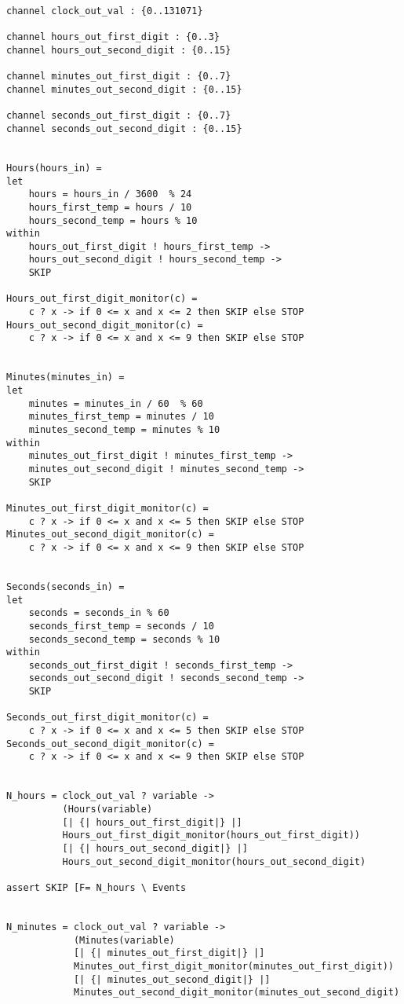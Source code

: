 \begin{verbatim}
channel clock_out_val : {0..131071}

channel hours_out_first_digit : {0..3}
channel hours_out_second_digit : {0..15}

channel minutes_out_first_digit : {0..7}
channel minutes_out_second_digit : {0..15}

channel seconds_out_first_digit : {0..7}
channel seconds_out_second_digit : {0..15}


Hours(hours_in) =
let
    hours = hours_in / 3600  % 24
    hours_first_temp = hours / 10
    hours_second_temp = hours % 10
within
    hours_out_first_digit ! hours_first_temp ->
    hours_out_second_digit ! hours_second_temp ->
    SKIP

Hours_out_first_digit_monitor(c) =
    c ? x -> if 0 <= x and x <= 2 then SKIP else STOP
Hours_out_second_digit_monitor(c) =
    c ? x -> if 0 <= x and x <= 9 then SKIP else STOP


Minutes(minutes_in) =
let
    minutes = minutes_in / 60  % 60
    minutes_first_temp = minutes / 10
    minutes_second_temp = minutes % 10
within
    minutes_out_first_digit ! minutes_first_temp ->
    minutes_out_second_digit ! minutes_second_temp ->
    SKIP

Minutes_out_first_digit_monitor(c) =
    c ? x -> if 0 <= x and x <= 5 then SKIP else STOP
Minutes_out_second_digit_monitor(c) =
    c ? x -> if 0 <= x and x <= 9 then SKIP else STOP


Seconds(seconds_in) =
let
    seconds = seconds_in % 60
    seconds_first_temp = seconds / 10
    seconds_second_temp = seconds % 10
within
    seconds_out_first_digit ! seconds_first_temp ->
    seconds_out_second_digit ! seconds_second_temp ->
    SKIP

Seconds_out_first_digit_monitor(c) =
    c ? x -> if 0 <= x and x <= 5 then SKIP else STOP
Seconds_out_second_digit_monitor(c) =
    c ? x -> if 0 <= x and x <= 9 then SKIP else STOP


N_hours = clock_out_val ? variable ->
          (Hours(variable)
          [| {| hours_out_first_digit|} |]
          Hours_out_first_digit_monitor(hours_out_first_digit))
          [| {| hours_out_second_digit|} |]
          Hours_out_second_digit_monitor(hours_out_second_digit)

assert SKIP [F= N_hours \ Events


N_minutes = clock_out_val ? variable ->
            (Minutes(variable)
            [| {| minutes_out_first_digit|} |]
            Minutes_out_first_digit_monitor(minutes_out_first_digit))
            [| {| minutes_out_second_digit|} |]
            Minutes_out_second_digit_monitor(minutes_out_second_digit)


\end{verbatim}
